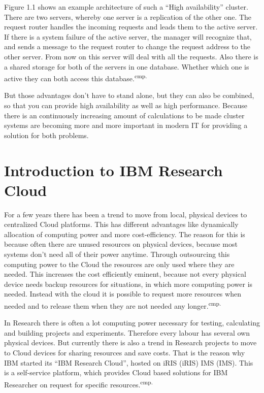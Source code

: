 Figure 1.1 shows an example architecture of such a ``High availability'' cluster. There are two servers, whereby one server is a replication of the other one. The request router handles the incoming requests and leads them to the active server. If there is a system failure of the active server, the manager will recognize that, and sends a message to the request router to change the request address to the other server. From now on this server will deal with all the requests. Also there is a shared storage for both of the servers in one database. Whether which one is active they can both access this database.\textsuperscript{cmp.\cite{4}}


But those advantages don't have to stand alone, but they can also be combined, so that you can provide high availability as well as high performance. Because there is an continuously increasing amount of calculations to be made cluster systems are becoming more and more important in modern IT for providing a solution for both problems.

\section{Introduction to IBM Research Cloud}

For a few years there has been a trend to move from local, physical devices to centralized Cloud platforms. This has different advantages like dynamically allocation of computing power and more cost-efficiency. The reason for this is because often there are unused resources on physical devices, because most systems don't need all of their power anytime. Through outsourcing this computing power to the Cloud the resources are only used where they are needed. This increases the cost efficiently eminent, because not every physical device needs backup resources for situations, in which more computing power is needed. Instead with the cloud it is possible to request more resources when needed and to release them when they are not needed any longer.\textsuperscript{cmp.\cite{8}}


In Research there is often a lot computing power necessary for testing, calculating and building projects and experiments. Therefore every labour has several own physical devices. But currently there is also a trend in Research projects to move to Cloud devices for sharing resources and save costs. That is the reason why IBM started its ``IBM Research Cloud'', hosted on \acs{iRIS} (\acl{iRIS}) \acs{IMS} (\acl{IMS}). This is a self-service platform, which provides Cloud based solutions for IBM Researcher on request for specific resources.\textsuperscript{cmp.\cite{9}}


